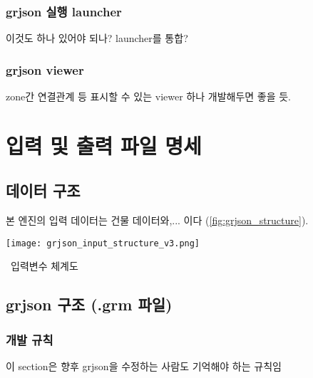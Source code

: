 \subsection{grjson 실행 launcher}

이것도 하나 있어야 되나? launcher를 통합?

\subsection{grjson viewer}

zone간 연결관계 등 표시할 수 있는 viewer 하나 개발해두면 좋을 듯.

\chapter{입력 및 출력 파일 명세}



\section{ 데이터 구조}
본 엔진의 입력 데이터는 건물 데이터와,... 이다 (\ref{fig:grjson_structure}).

\begin{defaultfigure}
  \texttt{[image: grjson\_input\_structure\_v3.png]}
  \caption{\simulator\ 입력변수 체계도}
  \label{fig:grjson_structure}
\end{defaultfigure}


\section{grjson 구조 (.grm 파일)}
\subsection{개발 규칙}
이 section은 향후 grjson을 수정하는 사람도 기억해야 하는 규칙임

